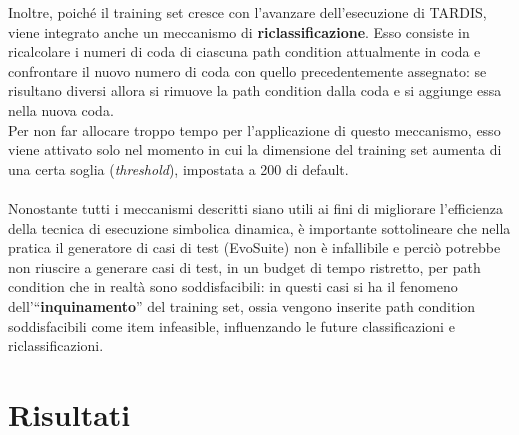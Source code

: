 \documentclass[a4paper, 12pt, oneside]{book}
\newcommand{\qq}[1]{``#1''}
\theoremstyle{normal}
\begin{document}
\clearpage \noindent Inoltre, poiché il training set cresce con l'avanzare dell'esecuzione di TARDIS, viene integrato anche un meccanismo di \textbf{riclassificazione}. Esso consiste in ricalcolare i numeri di coda di ciascuna path condition attualmente in coda e confrontare il nuovo numero di coda con quello precedentemente assegnato: se risultano diversi allora si rimuove la path condition dalla coda e si aggiunge essa nella nuova coda. \\ Per non far allocare troppo tempo per l'applicazione di questo meccanismo, esso viene attivato solo nel momento in cui la dimensione del training set aumenta di una certa soglia (\emph{threshold}), impostata a 200 di default. \\ \\ Nonostante tutti i meccanismi descritti siano utili ai fini di migliorare l'efficienza della tecnica di esecuzione simbolica dinamica, è importante sottolineare che nella pratica il generatore di casi di test (EvoSuite) non è infallibile e perciò potrebbe non riuscire a generare casi di test, in un budget di tempo ristretto, per path condition che in realtà sono soddisfacibili: in questi casi si ha il fenomeno dell'\qq{\textbf{inquinamento}} del training set, ossia vengono inserite path condition soddisfacibili come item infeasible, influenzando le future classificazioni e riclassificazioni.

\clearpage
\section{Risultati}\label{section:results-mipc}
\end{document}
